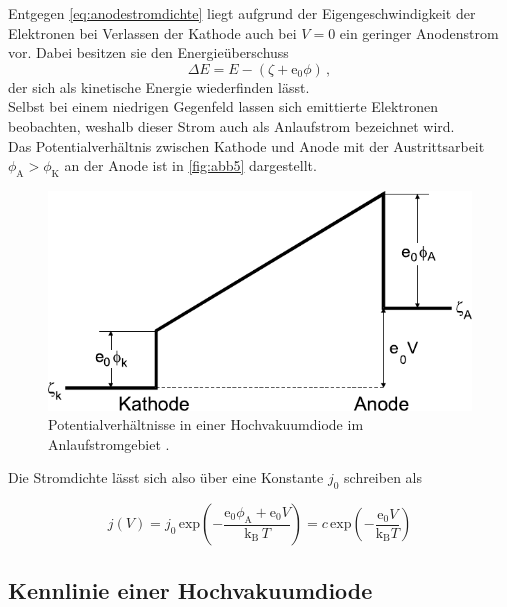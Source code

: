 Entgegen \eqref{eq:anodestromdichte} liegt aufgrund der Eigengeschwindigkeit der Elektronen bei Verlassen
der Kathode auch bei $V = 0$ ein geringer Anodenstrom vor.
Dabei besitzen sie den Energieüberschuss
\begin{equation*}
    \Delta E = E - (\zeta + \text{e}_0 \phi) \,,
\end{equation*}
der sich als kinetische Energie wiederfinden lässt. \\

Selbst bei einem niedrigen Gegenfeld lassen sich emittierte Elektronen beobachten,
weshalb dieser Strom auch als Anlaufstrom bezeichnet wird. \\

Das Potentialverhältnis zwischen Kathode und Anode mit der
Austrittsarbeit $\phi_\text{A} > \phi_\text{K}$ an der Anode
ist in \autoref{fig:abb5} dargestellt.

\begin{figure}[H]
    \centering
    \includegraphics{figures/Abb5.pdf}
    \caption{Potentialverhältnisse in einer Hochvakuumdiode im Anlaufstromgebiet \cite{ap09}.}
    \label{fig:abb5}
\end{figure}

Die Stromdichte lässt sich also über eine Konstante $j_0$ schreiben als

\begin{equation}
    j(V) = j_0 \, \text{exp}\left(-\dfrac{\text{e}_0 \phi_\text{A} + \text{e}_0 V}{\text{k}_\text{B} \, T} \right)
         = c \,\text{exp}\left(-\dfrac{\text{e}_0 V}{\text{k}_\text{B} T} \right)
         \label{eq:stromladexp}
\end{equation}


\subsection{Kennlinie einer Hochvakuumdiode}

